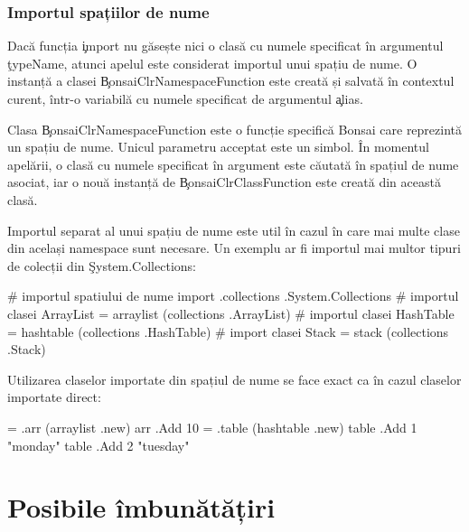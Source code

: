 \documentclass[12pt,a4paper]{memoir}
\begin{document}
\subsection{Importul spațiilor de nume}

Dacă funcția \c{import} nu găsește nici o clasă cu numele specificat în argumentul \c{typeName}, atunci apelul este considerat importul unui spațiu de nume. O instanță a clasei \c{BonsaiClrNamespaceFunction} este creată și salvată în contextul curent, într-o variabilă cu numele specificat de argumentul \c{alias}.

Clasa \c{BonsaiClrNamespaceFunction} este o funcție specifică Bonsai care reprezintă un spațiu de nume. Unicul parametru acceptat este un simbol. În momentul apelării, o clasă cu numele specificat în argument este căutată în spațiul de nume asociat, iar o nouă instanță de \c{BonsaiClrClassFunction} este creată din această clasă.

Importul separat al unui spațiu de nume este util în cazul în care mai multe clase din același namespace sunt necesare. Un exemplu ar fi importul mai multor tipuri de colecții din \c{System.Collections}:
\begin{code}
# importul spatiului de nume 
import .collections .System.Collections
# importul clasei ArrayList
= arraylist (collections .ArrayList)
# importul clasei HashTable
= hashtable (collections .HashTable)
# import clasei Stack
= stack (collections .Stack)
\end{code}

Utilizarea claselor importate din spațiul de nume se face exact ca în cazul claselor importate direct:
\begin{code}
= .arr (arraylist .new)
arr .Add 10
= .table (hashtable .new)
table .Add 1 "monday"
table .Add 2 "tuesday"
\end{code}


\chapter{Posibile îmbunătățiri}
\end{document}
